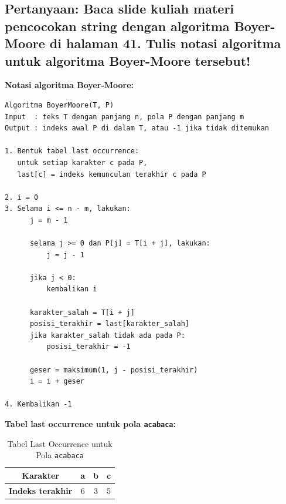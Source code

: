 \subsection*{Pertanyaan: Baca slide kuliah materi pencocokan string dengan algoritma Boyer-Moore di halaman 41. Tulis notasi algoritma untuk algoritma Boyer-Moore tersebut!}

\textbf{Notasi algoritma Boyer-Moore:}

\begin{lstlisting}[basicstyle=\ttfamily\scriptsize, frame=single, backgroundcolor=\color{white}, numbers=none, keywordstyle=\color{black}, commentstyle=\color{black}, stringstyle=\color{black}, breaklines=true]
Algoritma BoyerMoore(T, P)
Input  : teks T dengan panjang n, pola P dengan panjang m
Output : indeks awal P di dalam T, atau -1 jika tidak ditemukan

1. Bentuk tabel last occurrence:
   untuk setiap karakter c pada P,
   last[c] = indeks kemunculan terakhir c pada P

2. i = 0
3. Selama i <= n - m, lakukan:
      j = m - 1

      selama j >= 0 dan P[j] = T[i + j], lakukan:
          j = j - 1

      jika j < 0:
          kembalikan i

      karakter_salah = T[i + j]
      posisi_terakhir = last[karakter_salah]
      jika karakter_salah tidak ada pada P:
          posisi_terakhir = -1

      geser = maksimum(1, j - posisi_terakhir)
      i = i + geser

4. Kembalikan -1
\end{lstlisting}

\textbf{Tabel last occurrence untuk pola \texttt{acabaca}:}

\begin{table}[H]
    \centering
    \caption{Tabel Last Occurrence untuk Pola \texttt{acabaca}}
    \label{tab:praktikum10-last-occurrence-pretest}
    \begin{tabular}{cccc}
    \toprule
    \textbf{Karakter} & a & b & c \\ \midrule
    \textbf{Indeks terakhir} & 6 & 3 & 5 \\ \bottomrule
    \end{tabular}
\end{table}
